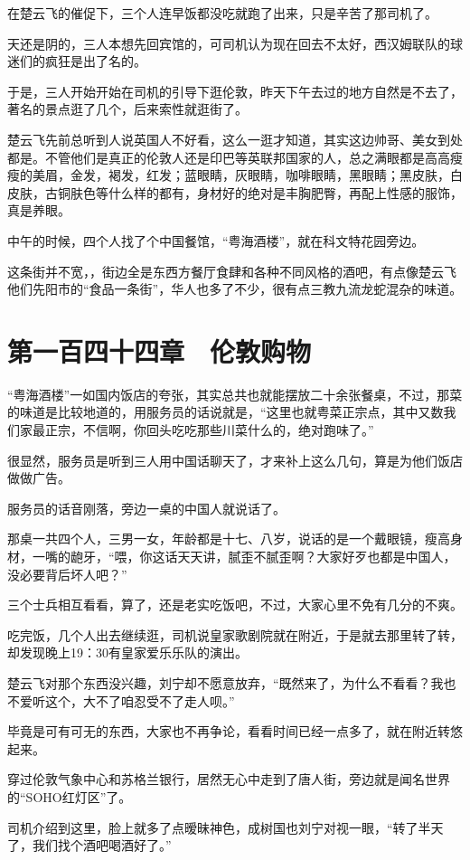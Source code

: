 在楚云飞的催促下，三个人连早饭都没吃就跑了出来，只是辛苦了那司机了。

天还是阴的，三人本想先回宾馆的，可司机认为现在回去不太好，西汉姆联队的球迷们的疯狂是出了名的。

于是，三人开始开始在司机的引导下逛伦敦，昨天下午去过的地方自然是不去了，著名的景点逛了几个，后来索性就逛街了。

楚云飞先前总听到人说英国人不好看，这么一逛才知道，其实这边帅哥、美女到处都是。不管他们是真正的伦敦人还是印巴等英联邦国家的人，总之满眼都是高高瘦瘦的美眉，金发，褐发，红发；蓝眼睛，灰眼睛，咖啡眼睛，黑眼睛；黑皮肤，白皮肤，古铜肤色等什么样的都有，身材好的绝对是丰胸肥臀，再配上性感的服饰，真是养眼。

中午的时候，四个人找了个中国餐馆，“粤海酒楼”，就在科文特花园旁边。

这条街并不宽，，街边全是东西方餐厅食肆和各种不同风格的酒吧，有点像楚云飞他们先阳市的“食品一条街”，华人也多了不少，很有点三教九流龙蛇混杂的味道。

\section{第一百四十四章　伦敦购物}

“粤海酒楼”一如国内饭店的夸张，其实总共也就能摆放二十余张餐桌，不过，那菜的味道是比较地道的，用服务员的话说就是，“这里也就粤菜正宗点，其中又数我们家最正宗，不信啊，你回头吃吃那些川菜什么的，绝对跑味了。”

很显然，服务员是听到三人用中国话聊天了，才来补上这么几句，算是为他们饭店做做广告。

服务员的话音刚落，旁边一桌的中国人就说话了。

那桌一共四个人，三男一女，年龄都是十七、八岁，说话的是一个戴眼镜，瘦高身材，一嘴的龅牙，“喂，你这话天天讲，腻歪不腻歪啊？大家好歹也都是中国人，没必要背后坏人吧？”

三个士兵相互看看，算了，还是老实吃饭吧，不过，大家心里不免有几分的不爽。

吃完饭，几个人出去继续逛，司机说皇家歌剧院就在附近，于是就去那里转了转，却发现晚上19：30有皇家爱乐乐队的演出。

楚云飞对那个东西没兴趣，刘宁却不愿意放弃，“既然来了，为什么不看看？我也不爱听这个，大不了咱忍受不了走人呗。”

毕竟是可有可无的东西，大家也不再争论，看看时间已经一点多了，就在附近转悠起来。

穿过伦敦气象中心和苏格兰银行，居然无心中走到了唐人街，旁边就是闻名世界的“SOHO红灯区”了。

司机介绍到这里，脸上就多了点暧昧神色，成树国也刘宁对视一眼，“转了半天了，我们找个酒吧喝酒好了。”

